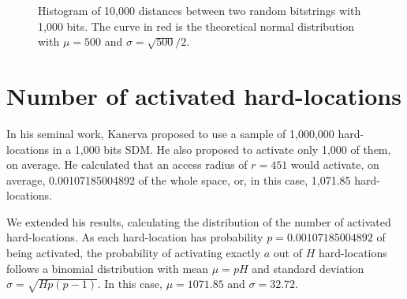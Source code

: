 \begin{figure}[!htb]
  \centering

  \caption{Histogram of 10,000 distances between two random bitstrings with 1,000 bits. The curve in red is the theoretical normal distribution with $\mu = 500$ and $\sigma = \sqrt{500}/2$.}
  \label{fig:validation-distance}
\end{figure}


\section{Number of activated hard-locations}

In his seminal work, Kanerva proposed to use a sample of 1,000,000 hard-locations in a 1,000 bits SDM. He also proposed to activate only 1,000 of them, on average. He calculated that an access radius of $r=451$ would activate, on average, 0.00107185004892 of the whole space, or, in this case, 1,071.85 hard-locations.

We extended his results, calculating the distribution of the number of activated hard-locations. As each hard-location has probability $p=0.00107185004892$ of being activated, the probability of activating exactly $a$ out of $H$ hard-locations follows a binomial distribution with mean $\mu = pH$ and standard deviation $\sigma = \sqrt{Hp(p-1)}$. In this case, $\mu = 1071.85$ and $\sigma = 32.72$.

